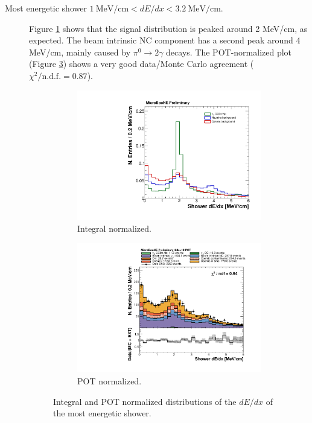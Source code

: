 \begin{description}
\item[Most energetic shower $1~\mathrm{MeV/cm} < dE/dx <3.2~\mathrm{MeV/cm}$.] Figure \ref{fig:dedx_integral} shows that the signal distribution is peaked around 2 MeV/cm, as expected. The beam intrinsic NC component has a second peak around 4 MeV/cm, mainly caused by $\pi^0\rightarrow2\gamma$ decays. The POT-normalized plot (Figure \ref{fig:dedx_pot}) shows a very good data/Monte Carlo agreement ($\chi^2 / \mathrm{n.d.f.} = 0.87$).

\begin{figure}[htbp]
\centering
  \begin{subfigure}{0.45\textwidth}
    \includegraphics[width=\linewidth]{figures/h_dedx_norm.pdf}
    \caption{Integral normalized.} \label{fig:dedx_integral}
  \end{subfigure}
    \begin{subfigure}{0.45\textwidth}
    \includegraphics[width=\linewidth]{figures/h_dedx.pdf}
    \caption{POT normalized.} \label{fig:dedx_pot}
  \end{subfigure}
  \caption{Integral and POT normalized distributions of the $dE/dx$ of the most energetic shower.}
\end{figure}


\end{description}
